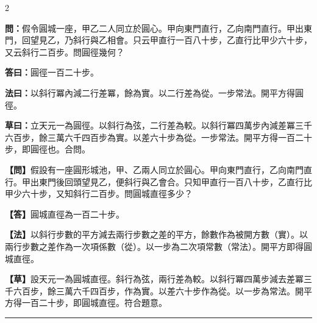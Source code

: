 \documentclass[11pt,a4paper]{article}
\newcommand{\longline}{\noindent\rule{\textwidth}{0.4pt}}
\newcommand{\wenC}[1]{\par\noindent\textbf{\textcolor{probcolor}{問：}}{#1}\par}
\newcommand{\daC}[1]{\par\noindent\textbf{\textcolor{anscolor}{答曰：}}{#1}\par}
\newcommand{\fayueC}[1]{\par\noindent\textbf{\textcolor{methodcolor}{法曰：}}{#1}\par}
\newcommand{\caoyueC}[1]{\par\noindent\textbf{草曰：}{#1}\par}
\newcommand{\wenM}[1]{\par\noindent\textbf{\textcolor{probcolor}{【問】}}{#1}\par}
\newcommand{\daM}[1]{\par\noindent\textbf{\textcolor{anscolor}{【答】}}{#1}\par}
\newcommand{\fayueM}[1]{\par\noindent\textbf{\textcolor{methodcolor}{【法】}}{#1}\par}
\newcommand{\caoyueM}[1]{\par\noindent\textbf{【草】}{#1}\par}
\begin{document}
\begin{paracol}{2}

\wenC{假令圓城一座，甲乙二人同立於圓心。甲向東門直行，乙向南門直行。甲出東門，回望見乙，乃斜行與乙相會。只云甲直行一百八十步，乙直行比甲少六十步，又云斜行二百步。問圓徑幾何？}

\daC{圓徑一百二十步。}

\fayueC{以斜行冪內減二行差冪，餘為實。以二行差為從。一步常法。開平方得圓徑。}

\caoyueC{立天元一為圓徑。以斜行為弦，二行差為較。以斜行冪四萬步內減差冪三千六百步，餘三萬六千四百步為實。以差六十步為從。一步常法。開平方得一百二十步，即圓徑也。合問。}

\switchcolumn

\wenM{假設有一座圓形城池，甲、乙兩人同立於圓心。甲向東門直行，乙向南門直行。甲出東門後回頭望見乙，便斜行與乙會合。只知甲直行一百八十步，乙直行比甲少六十步，又知斜行二百步。問圓城直徑多少？}

\daM{圓城直徑為一百二十步。}

\fayueM{以斜行步數的平方減去兩行步數之差的平方，餘數作為被開方數（實）。以兩行步數之差作為一次項係數（從）。以一步為二次項常數（常法）。開平方即得圓城直徑。}

\caoyueM{設天元一為圓城直徑。斜行為弦，兩行差為較。以斜行冪四萬步減去差冪三千六百步，餘三萬六千四百步，作為實。以差六十步作為從。以一步為常法。開平方得一百二十步，即圓城直徑。符合題意。}

\end{paracol}

\vspace{0.3cm}
\longline
\end{document}
